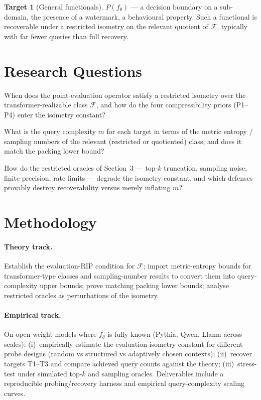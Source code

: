 \documentclass[11pt,a4paper]{article}
\theoremstyle{definition}
\newtheorem{target}{Target}
\newcommand{\Fclass}{\mathcal{F}}
\begin{document}
\begin{target}[General functionals]
$P(f_\theta)$ --- a decision boundary on a sub-domain, the presence of a
watermark, a behavioural property. Such a functional is recoverable under a
restricted isometry on the relevant quotient of $\Fclass$, typically with far
fewer queries than full recovery.
\end{target}

\section{Research Questions}

\begin{description}[leftmargin=*,style=nextline]
  \item[RQ1.] When does the point-evaluation operator satisfy a restricted
  isometry over the transformer-realizable class $\Fclass$, and how do the four
  compressibility priors (P1--P4) enter the isometry constant?
  \item[RQ2.] What is the query complexity $m$ for each target in terms of the
  metric entropy / sampling numbers of the relevant (restricted or quotiented)
  class, and does it match the packing lower bound?
  \item[RQ3.] How do the restricted oracles of Section~3 --- top-$k$ truncation,
  sampling noise, finite precision, rate limits --- degrade the isometry constant,
  and which defenses provably destroy recoverability versus merely inflating $m$?
\end{description}

\section{Methodology}

\paragraph{Theory track.} Establish the evaluation-RIP condition for $\Fclass$;
import metric-entropy bounds for transformer-type classes and sampling-number
results to convert them into query-complexity upper bounds; prove matching packing
lower bounds; analyse restricted oracles as perturbations of the isometry.

\paragraph{Empirical track.} On open-weight models where $f_\theta$ is fully
known (Pythia, Qwen, Llama across scales): (i)~empirically estimate the
evaluation-isometry constant for different probe designs (random vs structured vs
adaptively chosen contexts); (ii)~recover targets T1--T3 and compare achieved
query counts against the theory; (iii)~stress-test under simulated top-$k$ and
sampling oracles. Deliverables include a reproducible probing/recovery harness and
empirical query-complexity scaling curves.
\end{document}
